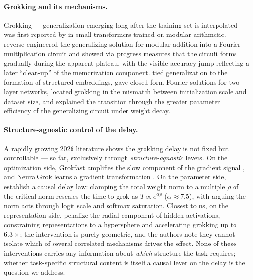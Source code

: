 \documentclass[11pt]{article}
\begin{document}
\paragraph{Grokking and its mechanisms.}
Grokking --- generalization emerging long after the training set is interpolated --- was first
reported by \citet{power2022grokking} in small transformers trained on modular arithmetic.
\citet{nanda2023progress} reverse-engineered the generalizing solution for modular addition into a
Fourier multiplication circuit and showed via progress measures that the circuit forms gradually
during the apparent plateau, with the visible accuracy jump reflecting a later ``clean-up'' of the
memorization component. \citet{liu2022towards} tied generalization to the formation of structured
embeddings, \citet{gromov2023grokking} gave closed-form Fourier solutions for two-layer networks,
\citet{liu2023omnigrok} located grokking in the mismatch between initialization scale and dataset
size, and \citet{varma2023explaining} explained the transition through the greater parameter
efficiency of the generalizing circuit under weight decay.

\paragraph{Structure-agnostic control of the delay.}
A rapidly growing 2026 literature shows the grokking delay is not fixed but controllable ---
so far, exclusively through \emph{structure-agnostic} levers. On the optimization side, Grokfast
amplifies the slow component of the gradient signal \citep{lee2024grokfast}, and NeuralGrok learns
a gradient transformation \citep{neuralgrok2025}. On the parameter side,
\citet{weightnormdelay2026} establish a causal delay law: clamping the total weight norm to a
multiple $\rho$ of the critical norm rescales the time-to-grok as $T\propto e^{\alpha\rho}$
($\alpha\!\approx\!7.5$), with \citet{logitscale2026} arguing the norm acts through logit scale
and softmax saturation. Closest to us, on the representation side, \citet{radialsuppression2026}
penalize the radial component of hidden activations, constraining representations to a hypersphere
and accelerating grokking up to $6.3\times$; the intervention is purely geometric, and the authors
note they cannot isolate which of several correlated mechanisms drives the effect. None of these
interventions carries any information about \emph{which} structure the task requires; whether
task-specific structural content is itself a causal lever on the delay is the question we address.
\end{document}
